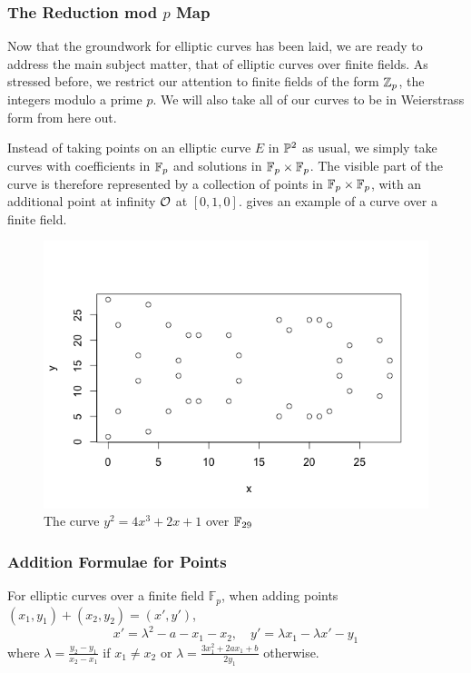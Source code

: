 \subsubsection{The Reduction mod $p$ Map}
Now that the groundwork for elliptic curves has been laid, we are ready to address the main subject matter, that of elliptic curves over finite fields.
As stressed before, we restrict our attention to finite fields of the form $\zn[p]$, the integers modulo a prime $p$.
We will also take all of our curves to be in Weierstrass form from here out.
%
% 
% 
% 
% 

Instead of taking points on an elliptic curve $E$ in $\pn[2]$ as usual, we simply take curves with coefficients in $\fp$ and solutions in $\fp \times \fp$.
The visible part of the curve is therefore represented by a collection of points in $\fp \times \fp$, with an additional point at infinity $\pai$ at $[0,1,0]$.
 gives an example of a curve over a finite field.
\begin{figure}[htbp]
	\centering
	\includegraphics[scale=0.5]{../Figures/finiteellipticcurve.png}
	\caption{The curve $y^2 = 4x^3 + 2x + 1$ over $\fp[29]$}
	\label{finitecurve}
\end{figure}
\subsubsection{Addition Formulae for Points}
For elliptic curves over a finite field $\mathbb{F}_p$, when adding points $(x_1,y_1) + (x_2,y_2) = (x',y')$,
$$x'=\lambda^2 - a - x_1 - x_2,\quad y' = \lambda x_1 -\lambda x' - y_1 $$
where $\lambda = \frac{y_2-y_1}{x_2-x_1}$ if $x_1\neq x_2$ or $\lambda=\frac{3x_1^2 + 2ax_1 + b}{2y_1}$ otherwise.
